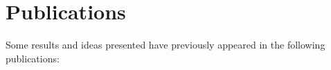 

\chapter*{Publications} %

Some results and ideas presented have previously appeared in the following publications: \\


\begin{refsection}[ownpubs]
    \small
    \nocite{*} %
    \printbibliography[heading=none]
    \cite{this_paper}
\end{refsection}




